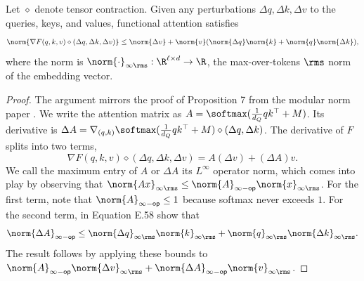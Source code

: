 \begin{theorembox}
    \label{thm:function-attention-is-lipschitz}
    Let $\diamond$ denote tensor contraction. Given any perturbations $\Delta q, \Delta k, \Delta v$ to the queries, keys, and values, functional attention satisfies \begin{equation}
    \norm{\nabla F(q, k, v) \diamond (\Delta q, \Delta k, \Delta v)} \leq \norm{\Delta v} + \norm{v} (\norm{\Delta q} \norm{k} + \norm{q} \norm{\Delta k}),
\end{equation} where the norm is $\norm{\cdot}_{\infty \rms} : \R^{\ell \times d} \to \R$, the max-over-tokens $\rms$ norm of the embedding vector.
\end{theorembox}

\begin{proof}
    The argument mirrors the proof of Proposition 7 from the modular norm paper \citep{large2024}. We write the attention matrix as $A = \softmax(\tfrac{1}{d_Q} qk^\top + M)$. Its derivative is $\Delta A = \nabla_{(q,k)} \softmax(\tfrac{1}{d_Q} qk^\top + M) \diamond (\Delta q, \Delta k)$. The derivative of $F$ splits into two terms, \begin{equation}
        \label{eq:attention-lipschitz}
        \nabla F(q, k, v) \diamond (\Delta q, \Delta k, \Delta v) = A (\Delta v) + (\Delta A) v.
    \end{equation} We call the maximum entry of $A$ or $\Delta A$ its $L^\infty$ operator norm, which comes into play by observing that $\norm{Ax}_{\infty\rms} \leq \norm{A}_{\infty-\mathsf{op}} \norm{x}_{\infty\rms}$. For the first term, note that $\norm{A}_{\infty-\mathsf{op}} \leq 1$ because softmax never exceeds $1$. For the second term, \citet{large2024} in Equation E.58 show that \begin{equation}
        \norm{\Delta A}_{\infty-\mathsf{op}} \leq \norm{\Delta q}_{\infty\rms} \norm{k}_{\infty\rms} + \norm{q}_{\infty\rms} \norm{\Delta k}_{\infty\rms}.
    \end{equation} The result follows by applying these bounds to $\norm{A}_{\infty-\mathsf{op}} \norm{\Delta v}_{\infty\rms} + \norm{\Delta A}_{\infty-\mathsf{op}} \norm{v}_{\infty\rms}$.
\end{proof}

